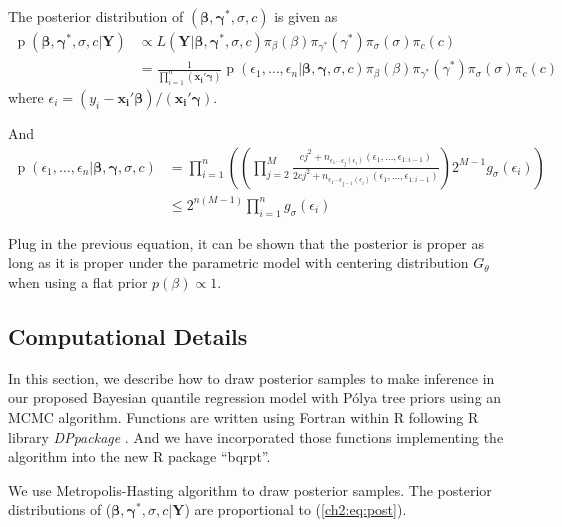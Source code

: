 \documentclass[12pt]{article}
\newcommand{\polya}{P\'{o}lya}
\DeclareMathOperator{\pr}{p}
\begin{document}
The posterior distribution of $(\bm{\beta}, \bm{\gamma^{*}}, \sigma, c)$ is given as
\begin{equation*}
  \begin{aligned}
    \pr(\bm{\beta}, \bm{\gamma^{*}}, \sigma, c|\bm{Y}) & \propto L(\bm{Y}|
    \bm{\beta}, \bm{\gamma^{*}}, \sigma, c) \pi_{\beta}(\beta)
    \pi_{\gamma^{*}}(\gamma^{*}) \pi_{\sigma}(\sigma) \pi_c(c) \\
    & = \frac{1}{\prod_{i=1}^n (\bm{x_i'\gamma})} \pr \left(
      \epsilon_1, \ldots, \epsilon_n | \bm{\beta}, \bm{\gamma},
      \sigma, c\right) \pi_{\beta}(\beta)
    \pi_{\gamma^{*}}(\gamma^{*}) \pi_{\sigma}(\sigma) \pi_c(c)
  \end{aligned}
\end{equation*}
where $\epsilon_i = (y_i - \bm{x_i'\beta})/(\bm{x_i'\gamma})$.

And
\begin{align*}
\pr \left(\epsilon_1, \ldots, \epsilon_n | \bm{\beta}, \bm{\gamma}, \sigma, c\right) &
 = \prod_{i = 1}^{n} \left( \left(\prod_{j=2}^M \frac{cj^2 + n_{\epsilon_1 \cdots \epsilon_j(\epsilon_{i}) }(\epsilon_1, \ldots, \epsilon_{1:i-1})}{2cj^2+ n_{\epsilon_1 \cdots \epsilon_{j-1}(\epsilon_i)}(\epsilon_1, \ldots, \epsilon_{1:i-1})}    \right) 2^{M-1} g_{\sigma}(\epsilon_i) \right) \\
& \le 2^{n(M-1)} \prod_{i = 1}^n g_{\sigma}(\epsilon_i)
\end{align*}

Plug in the previous equation, it can be shown that the posterior is proper as long as it is proper under the parametric model with centering distribution $G_{\theta}$ when using a flat prior $p(\beta) \propto 1$.

\subsection{Computational Details}\label{ch2:sec:computation}

In this section, we describe how to draw posterior samples to make
inference in our proposed Bayesian quantile regression model with
\polya{} tree priors using an MCMC algorithm. Functions are written
using Fortran within R \citep{R} following R library
\textit{DPpackage} \citep{DPpackage}. And we have incorporated those
functions implementing the algorithm into the new R \citep{R} package
``bqrpt''.

We use Metropolis-Hasting algorithm to draw posterior samples. The
posterior distributions of ($\bm \beta, \bm \gamma^{*}, \sigma, c | \bm
Y$) are proportional to (\ref{ch2:eq:post}).
\end{document}
